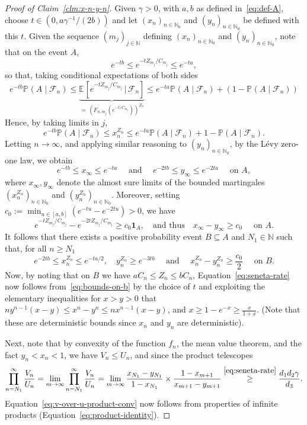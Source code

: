 \documentclass[12pt]{article}
\theoremstyle{definition}
\newcommand{\E}[2][]{\ensuremath{\mathbb{E}_{#1}\left[#2 \right]}}
\newcommand{\Prob}[2][]{\ensuremath{\mathbb{P}_{#1} \left(#2 \right)}}
\begin{document}
\begin{proof}[Proof of Claim~\ref{clm:x-n-y-n}]
Given $\gamma > 0$, with $a, b$ as defined in~\eqref{eq:def-A}, choose $t \in (0, a \gamma^{-1}/(2b))$ and let $(x_{n})_{n \in \mathbb{N}_0}$ and $(y_{n})_{n \in \mathbb{N}_0}$ be defined with this $t$.   Given the sequence $(m_{j})_{j \in \mathbb{N}}$ defining $(x_{n})_{n \in \mathbb{N}_0}$ and $(y_{n})_{n \in \mathbb{N}_0}$, note that on the event $A$,
\[
e^{-tb}
\leq
e^{-tZ_{m_j}/C_{m_j}}
\leq
e^{-ta},
\]
so that, taking conditional expectations of both sides 
\[
e^{-tb} \Prob{A \mid \mathcal{F}_n} \leq \underbrace{\E{e^{-tZ_{m_j}/C_{m_j}} \, \bigg | \, \mathcal{F}_n}}_{ = \, \left(F_{n, m_{j}}\left(e^{-t/C_{m_j}}\right)\right)^{Z_{n}}} \leq e^{-ta} \Prob{A \mid \mathcal{F}_n} + (1 - \Prob{A \mid \mathcal{F}_n})
\]
Hence, by taking limits in $j$, 
\[
e^{-tb}\mathbb P(A\mid\mathcal F_n)
\leq
x_{n}^{Z_n}
\leq
e^{-ta}\mathbb P(A\mid\mathcal F_n)
+
1-\mathbb P(A\mid\mathcal F_n).
\]
Letting $n\to\infty$, and applying similar reasoning to $(y_n)_{n \in \mathbb{N}_0}$, by the L\'evy zero-one law, we obtain
\[
e^{-tb}\leq x_\infty\leq e^{-ta} \quad \text{ and } \quad 
e^{-2tb}\leq y_\infty\leq e^{-2ta}
\quad \text{ on } A,
\]
where $x_{\infty}, y_{\infty}$ denote the almost sure limits of the bounded martingales $(x_n^{Z_{n}})_{n \in \mathbb{N}_0}$ and $(y_n^{Z_{n}})_{n \in \mathbb{N}_0}$.
Moreover, setting $c_0 := \min_{u\in[a,b]}
\left(e^{-tu}-e^{-2tu}\right)>0$,
we have
\[
e^{-tZ_{m_j}/C_{m_j}}
-
e^{-2tZ_{m_j}/C_{m_j}}
\geq c_0\mathbf 1_A, \quad \text{and thus} \quad 
x_\infty-y_\infty \geq c_0
\quad \text{ on } A.  
\]
It follows that there exists a positive probability event $B \subseteq A$ and $N_1 \in \mathbb{N}$ such that, for all $n \geq N_1$
\begin{equation} \label{eq:bounds-on-b}
e^{-2tb} \leq x_{n}^{Z_{n}} \leq e^{-ta/2}, \quad y_{n}^{Z_n} \geq e^{-3tb} \quad \text{ and } \quad x_{n}^{Z_n} - y_{n}^{Z_n} \geq \frac{c_0}{2} \quad \text{ on } B. 
\end{equation}
Now, by noting that on $B$ we have $aC_n \leq Z_{n} \leq bC_n$, Equation~\eqref{eq:seneta-rate} now follows from~\eqref{eq:bounds-on-b} by the choice of $t$ and exploiting the elementary inequalities for $x > y > 0$ that $n y^{n-1} (x-y) \leq x^{n} - y^{n} \leq n x^{n-1} (x-y)$, and $x \geq 1 -e^{-x} \geq \frac{x}{1+x}$. (Note that these are deterministic bounds since $x_n$ and $y_n$ are deterministic).

Next, note that by convexity of the function $f_{n}$, the mean value theorem, and the fact $y_n < x_n < 1$, we have $V_{n} \leq U_{n}$, and since the product telescopes
\[
\prod_{n=N_1}^{\infty} \frac{V_{n}}{U_{n}} = \lim_{m \to \infty} \prod_{n=N_1}^{\infty} \frac{V_{n}}{U_{n}} = \lim_{m \to \infty} \frac{x_{N_{1}} - y_{N_{1}}}{1-x_{N_{1}}} \times \frac{1 - x_{m+1}}{x_{m+1} - y_{m+1}} \stackrel{\eqref{eq:seneta-rate}}{\geq} \frac{d_1 d_2 \gamma}{d_3}. 
\]
Equation~\eqref{eq:v-over-u-product-conv} now follows from properties of infinite products (Equation~\eqref{eq:product-identity}). 
\end{proof}
\end{document}
